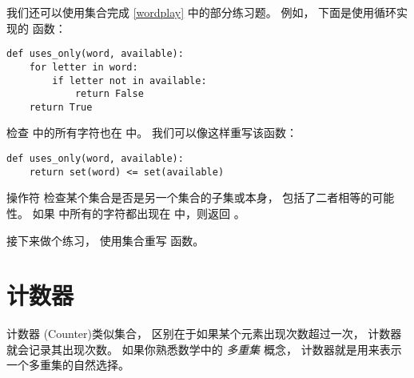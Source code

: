 我们还可以使用集合完成 \ref{wordplay} 中的部分练习题。  
例如， 下面是使用循环实现的  函数：

\begin{lstlisting}
def uses_only(word, available):
    for letter in word:
        if letter not in available:
            return False
    return True
\end{lstlisting}


 检查  中的所有字符也在  中。  
我们可以像这样重写该函数：

\begin{lstlisting}
def uses_only(word, available):
    return set(word) <= set(available)
\end{lstlisting}


操作符 \li{<=} 检查某个集合是否是另一个集合的子集或本身， 包括了二者相等的可能性。  
如果  中所有的字符都出现在  中，则返回  。


接下来做个练习， 使用集合重写  函数。

\section{计数器}


计数器 (Counter)类似集合， 区别在于如果某个元素出现次数超过一次， 计数器就会记录其出现次数。  如果你熟悉数学中的 {\em 多重集} 概念， 计数器就是用来表示一个多重集的自然选择。


